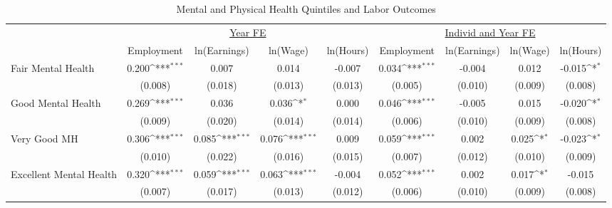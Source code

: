 \def\sym#1{\ifmmode^{#1}\else\(^{#1}\)\fi}
\begin{table}
\center\caption*{Mental and Physical Health Quintiles and Labor Outcomes}
\footnotesize
\begin{tabular}{l*{8}{c}}
                    &\multicolumn{4}{c}{\underline{Year FE}}                                                &\multicolumn{4}{c}{\underline{Individ and Year FE}}                                    \\\cmidrule(lr){2-5}\cmidrule(lr){6-9}
                    &\multicolumn{1}{c}{Employment}&\multicolumn{1}{c}{ln(Earnings)}&\multicolumn{1}{c}{ln(Wage)}&\multicolumn{1}{c}{ln(Hours)}&\multicolumn{1}{c}{Employment}&\multicolumn{1}{c}{ln(Earnings)}&\multicolumn{1}{c}{ln(Wage)}&\multicolumn{1}{c}{ln(Hours)}\\
\midrule
Fair Mental Health  &       0.200\sym{***}&       0.007         &       0.014         &      -0.007         &       0.034\sym{***}&      -0.004         &       0.012         &      -0.015\sym{*}  \\
                    &     (0.008)         &     (0.018)         &     (0.013)         &     (0.013)         &     (0.005)         &     (0.010)         &     (0.009)         &     (0.008)         \\
Good Mental Health  &       0.269\sym{***}&       0.036         &       0.036\sym{*}  &       0.000         &       0.046\sym{***}&      -0.005         &       0.015         &      -0.020\sym{*}  \\
                    &     (0.009)         &     (0.020)         &     (0.014)         &     (0.014)         &     (0.006)         &     (0.010)         &     (0.009)         &     (0.008)         \\
Very Good MH        &       0.306\sym{***}&       0.085\sym{***}&       0.076\sym{***}&       0.009         &       0.059\sym{***}&       0.002         &       0.025\sym{*}  &      -0.023\sym{*}  \\
                    &     (0.010)         &     (0.022)         &     (0.016)         &     (0.015)         &     (0.007)         &     (0.012)         &     (0.010)         &     (0.009)         \\
Excellent Mental Health&       0.320\sym{***}&       0.059\sym{***}&       0.063\sym{***}&      -0.004         &       0.052\sym{***}&       0.002         &       0.017\sym{*}  &      -0.015         \\
                    &     (0.007)         &     (0.017)         &     (0.013)         &     (0.012)         &     (0.006)         &     (0.010)         &     (0.009)         &     (0.008)         \\

\end{tabular}
\end{table}

